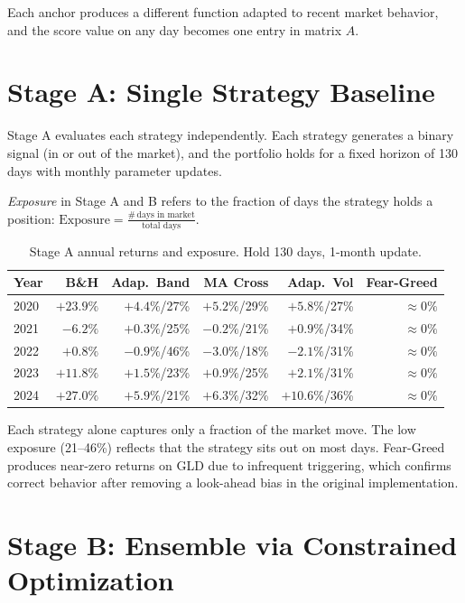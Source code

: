 \documentclass[11pt, letterpaper]{article}
\begin{document}
Each anchor produces a different function adapted to recent market behavior, and
the score value on any day becomes one entry in matrix $A$.

\section{Stage A: Single Strategy Baseline}

Stage A evaluates each strategy independently. Each strategy generates a binary
signal (in or out of the market), and the portfolio holds for a fixed horizon of
130 days with monthly parameter updates.

\textit{Exposure} in Stage A and B refers to the fraction of days the strategy
holds a position: $\text{Exposure} = \tfrac{\#\,\text{days in market}}{\text{total days}}$.

\begin{table}[h]
\centering
\caption{Stage A annual returns and exposure. Hold 130 days, 1-month update.}
\label{tab:stageA}
\begin{tabular}{lrrrrr}
\toprule
Year & B\&H    & Adap.\ Band & MA Cross  & Adap.\ Vol  & Fear-Greed \\
\midrule
2020 & $+23.9\%$ & $+4.4\%$/27\%  & $+5.2\%$/29\%  & $+5.8\%$/27\%  & $\approx 0\%$ \\
2021 & $-6.2\%$  & $+0.3\%$/25\%  & $-0.2\%$/21\%  & $+0.9\%$/34\%  & $\approx 0\%$ \\
2022 & $+0.8\%$  & $-0.9\%$/46\%  & $-3.0\%$/18\%  & $-2.1\%$/31\%  & $\approx 0\%$ \\
2023 & $+11.8\%$ & $+1.5\%$/23\%  & $+0.9\%$/25\%  & $+2.1\%$/31\%  & $\approx 0\%$ \\
2024 & $+27.0\%$ & $+5.9\%$/21\%  & $+6.3\%$/32\%  & $+10.6\%$/36\% & $\approx 0\%$ \\
\bottomrule
\end{tabular}
\end{table}

Each strategy alone captures only a fraction of the market move. The low exposure
(21--46\%) reflects that the strategy sits out on most days. Fear-Greed produces
near-zero returns on GLD due to infrequent triggering, which confirms correct
behavior after removing a look-ahead bias in the original implementation.

\section{Stage B: Ensemble via Constrained Optimization}
\end{document}

